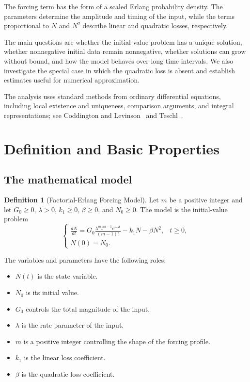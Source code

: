 \documentclass[12pt]{article}
\theoremstyle{definition}
\newtheorem{definition}[theorem]{Definition}
\theoremstyle{remark}
\begin{document}
The forcing term has the form of a scaled Erlang probability
density. The parameters determine the amplitude and timing
of the input, while the terms proportional to \(N\) and
\(N^2\) describe linear and quadratic losses, respectively.

The main questions are whether the initial-value problem
has a unique solution, whether nonnegative initial data
remain nonnegative, whether solutions can grow without
bound, and how the model behaves over long time intervals.
We also investigate the special case in which the quadratic
loss is absent and establish estimates useful for numerical
approximation.

The analysis uses standard methods from ordinary
differential equations, including local existence and
uniqueness, comparison arguments, and integral
representations; see Coddington and Levinson~\cite{coddington}
and Teschl~\cite{teschl}.

\section{Definition and Basic Properties}

\subsection{The mathematical model}

\begin{definition}[Factorial-Erlang Forcing Model]
Let \(m\) be a positive integer and let
\(G_0\geq 0\), \(\lambda>0\), \(k_1\geq 0\),
\(\beta\geq 0\), and \(N_0\geq 0\).
The model is the initial-value problem
\[
\begin{cases}
\displaystyle
\frac{dN}{dt}
=
G_0\frac{\lambda^m t^{m-1}e^{-\lambda t}}{(m-1)!}
-k_1N-\beta N^2,
& t\geq 0,\\[1.2em]
N(0)=N_0.
\end{cases}
\]
\end{definition}

The variables and parameters have the following roles:

\begin{itemize}
    \item \(N(t)\) is the state variable.
    \item \(N_0\) is its initial value.
    \item \(G_0\) controls the total magnitude of the input.
    \item \(\lambda\) is the rate parameter of the input.
    \item \(m\) is a positive integer controlling the shape
    of the forcing profile.
    \item \(k_1\) is the linear loss coefficient.
    \item \(\beta\) is the quadratic loss coefficient.
\end{itemize}
\end{document}

